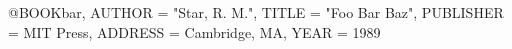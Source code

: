 @BOOK{bar,
	    AUTHOR = "Star, R. M.",
	    TITLE = "Foo Bar Baz",
	    PUBLISHER = {MIT Press},
	    ADDRESS = {Cambridge, MA},
	    YEAR = 1989}
